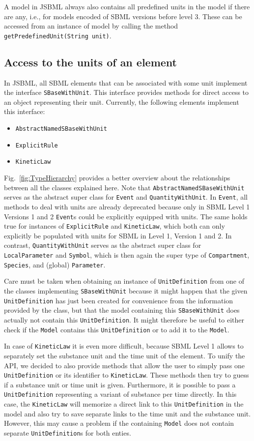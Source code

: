 \documentclass[
  BCOR12mm,
  letterpaper,
  11pt,
  headsepline,
  pointlessnumbers,
  tablecaptionabove,
  headinclude,
  appendixprefix,
  idxtotoc,
  bibtotoc,
  twoside,
  titlepage
]{scrartcl}
\begin{document}
A model in JSBML always also contains all predefined units in the model
if there are any, i.e., for models encoded of SBML versions before level
3. These can be accessed from an instance of model by calling the method
\verb!getPredefinedUnit(String unit)!.

\subsection{Access to the units of an element}

In JSBML, all SBML elements that can be associated with some unit implement the
interface \verb!SBaseWithUnit!. This interface provides methods for direct
access to an object representing their unit. Currently, the following elements
implement this interface:
\begin{itemize}
 \item \verb!AbstractNamedSBaseWithUnit!
 \item \verb!ExplicitRule!
 \item \verb!KineticLaw!
\end{itemize}
Fig.~\vref{fig:TypeHierarchy} provides a better overview about the relationships
between all the classes explained here.
Note that \verb!AbstractNamedSBaseWithUnit! serves as the abstract super class
for \verb!Event! and \verb!QuantityWithUnit!. In \verb!Event!, all methods to
deal with units are already deprecated because only in SBML Level 1 Versions 1
and 2 \verb!Event!s could be explicitly equipped with units. The same holds true
for instances of \verb!ExplicitRule! and \verb!KineticLaw!, which both can only
explicitly be populated with units for SBML in Level 1, Version 1 and 2. In
contrast, \verb!QuantityWithUnit! serves as the abstract super class for
\verb!LocalParameter! and \verb!Symbol!, which is then again the super type of
\verb!Compartment!, \verb!Species!, and (global) \verb!Parameter!.

Care must be taken when obtaining an instance of \verb!UnitDefinition! from one
of the classes implementing \verb!SBaseWithUnit!
because it might happen that the given \verb!UnitDefinition! has just been
created for convenience from the information provided by the class, but that the
model containing this \verb!SBaseWithUnit! does actually not contain this
\verb!UnitDefinition!. It might therefore be useful to either check if the
\verb!Model! contains this \verb!UnitDefinition! or to add it to the
\verb!Model!.

In case of \verb!KineticLaw! it is even more difficult, because
SBML Level 1 allows to separately set the substance unit and the time unit of
the element. To unify the API, we decided to also provide methods that allow
the user to simply pass one \verb!UnitDefinition! or its identifier to
\verb!KineticLaw!. These methods then try to guess if a substance unit or time
unit is given. Furthermore, it is possible to pass a \verb!UnitDefinition!
representing a variant of substance per time directly. In this case, the
\verb!KineticLaw! will memorize a direct link to this \verb!UnitDefinition! in
the model and also try to save separate links to the time unit and the substance
unit. However, this may cause a problem if the containing \verb!Model! does not
contain separate \verb!UnitDefinition!s for both enties.
\end{document}
